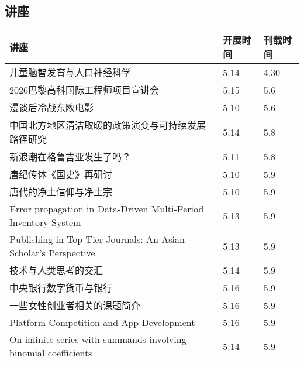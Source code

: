 \documentclass[letterpaper, 12pt]{article}
\begin{document}
\begin{multicols}{2}
\pagebreak

\section{讲座}
\begin{tabular}{|>{\centering\arraybackslash}m{}|m{}|m{}|}
    \hline
    讲座 & 开展时间 & 刊载时间\\
    \hline\hline
    儿童脑智发育与人口神经科学 & 5.14 & 4.30\\\hline
    2026巴黎高科国际工程师项目宣讲会 & 5.15 & 5.6\\\hline
    漫谈后冷战东欧电影 & 5.10 & 5.6\\\hline
    中国北方地区清洁取暖的政策演变与可持续发展路径研究 & 5.14 & 5.8\\\hline
    新浪潮在格鲁吉亚发生了吗？ & 5.11 & 5.8\\\hline
    唐纪传体《国史》再研讨 & 5.10 & 5.9\\\hline
    唐代的净土信仰与净土宗 & 5.10 & 5.9\\\hline
    Error propagation in Data-Driven Multi-Period Inventory System & 5.13 & 5.9\\\hline
    Publishing in Top Tier-Journals: An Asian Scholar’s Perspective & 5.13 & 5.9\\\hline
    技术与人类思考的交汇 & 5.14 & 5.9\\\hline
    中央银行数字货币与银行 & 5.16 & 5.9\\\hline
    一些女性创业者相关的课题简介 & 5.16 & 5.9\\\hline
    Platform Competition and App Development & 5.16 & 5.9\\\hline
    On infinite series with summands involving binomial coefficients & 5.14 & 5.9\\\hline
    
\end{tabular}

\end{multicols}
\end{document}
